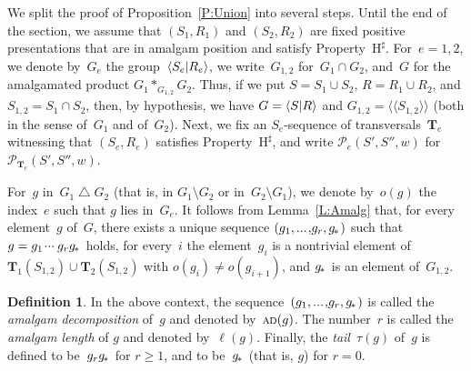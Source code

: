 \documentclass{amsart}
\numberwithin{equation}{section}
\theoremstyle{plain}
\theoremstyle{definition}
\newtheorem{defi}[prop]{Definition}
\let\ge=\geqslant
\begin{document}
We split the proof of Proposition~\ref{P:Union} into several steps. Until the end of the section, we assume that $({S}_1,{R}_1)$ and $({S}_2,{R}_2)$ are fixed positive presentations that are in amalgam position and satisfy Property~${{\mathrm{H}}^\sharp}$. For~${e} = 1,2$, we denote by~${G}_{e}$ the group~${\langle{{S}_{e}}{\mid}\nobreak{{R}_{e}}\rangle}$, we write~${G}_{1,2}$ for~${G}_1 \cap {G}_2$, and~${G}$ for the amalgamated product ${G}_1 *_{{G}_{1,2}} {G}_2$. Thus, if we put ${S} = {S}_1\cup {S}_2$, ${R} = {R}_1\cup {R}_2$, and ${S}_{1,2} = {S}_1\cap {S}_2$, then, by hypothesis, we have ${G} = {\langle{S}{\mid}\nobreak{R}\rangle}$ and ${G}_{1,2} = {\langle\!\langle{{{S}_{1,2}}}\rangle\!\rangle}$ (both in the sense of~${G}_1$ and of~${G}_2$). Next, we fix an ${S}_{e}$-sequence of transversals~${\boldsymbol{T}}_{e}$ witnessing that $({S}_{e}, {R}_{e})$ satisfies Property~${{\mathrm{H}}^\sharp}$, and write ${\mathcal{P}_{\!e}({{S}'}, {{S}''}, {w})}$ for ${\mathcal{P}}_{{\boldsymbol{T}}_{e}}({S}', {S}'', {w})$. 

For~${g}$ in~${G}_1 \bigtriangleup {G}_2$ (that is, in ${G}_1 \setminus {G}_2$ or in~${G}_2 \setminus {G}_1$), we denote by~${o({g})}$ the index~${e}$ such that ${g}$ lies in~${G}_{e}$. It follows from Lemma~\ref{L:Amalg} that, for every element~${g}$ of~${G}$, there exists a unique sequence $({g}_1 {, ...\hspace{0.2ex},} {g}_{r}, {{g}_{\hspace{-0.2ex}*\hspace{0.2ex}}})$ such that ${g} = {g}_1 {\hspace{0.2ex}{\cdot}{\cdot}{\cdot}\hspace{0.5ex}} {g}_{r} {{g}_{\hspace{-0.2ex}*\hspace{0.2ex}}}$ holds, for every~${i}$ the element~${g}_{i}$ is a nontrivial element of~${\boldsymbol{T}}_1({S}_{1,2}) \cup {\boldsymbol{T}}_2({S}_{1,2})$ with ${o({{g}_{i}})} \not= {o({{g}_{{i}+1}})}$, and ${{g}_{\hspace{-0.2ex}*\hspace{0.2ex}}}$ is an element of~${G}_{1,2}$. 

\begin{defi}
\label{D:CanDec}
In the above context, the sequence~$({g}_1 {, ...\hspace{0.2ex},} {g}_{r}, {{g}_{\hspace{-0.2ex}*\hspace{0.2ex}}})$ is called the \emph{amalgam decomposition} of~${g}$ and denoted by~${{\scriptstyle\mathrm{A\hspace{-0.1ex}D}}({g})}$. The number~${r}$ is called the \emph{amalgam length} of ${g}$ and denoted by~${\ell({g})}$. Finally, the \emph{tail}~${\tau({g})}$ of~${g}$ is defined to be~${g}_{r} {{g}_{\hspace{-0.2ex}*\hspace{0.2ex}}}$ for ${r} \ge 1$, and to be~${{g}_{\hspace{-0.2ex}*\hspace{0.2ex}}}$ (that is, ${g}$) for ${r} = 0$. 
\end{defi}
\end{document}
